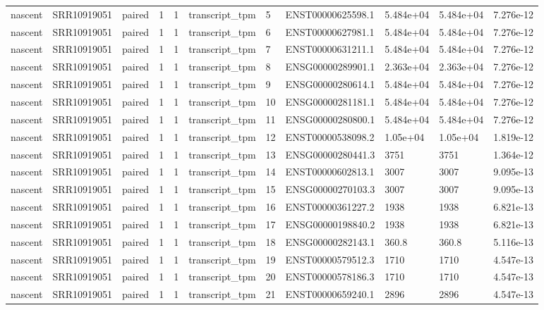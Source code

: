 \begin{tabular}{lllllllllll}
nascent & SRR10919051 & paired & 1 & 1 & transcript\_tpm & 5 & ENST00000625598.1 & 5.484e+04 & 5.484e+04 & 7.276e-12 \\
nascent & SRR10919051 & paired & 1 & 1 & transcript\_tpm & 6 & ENST00000627981.1 & 5.484e+04 & 5.484e+04 & 7.276e-12 \\
nascent & SRR10919051 & paired & 1 & 1 & transcript\_tpm & 7 & ENST00000631211.1 & 5.484e+04 & 5.484e+04 & 7.276e-12 \\
nascent & SRR10919051 & paired & 1 & 1 & transcript\_tpm & 8 & ENSG00000289901.1 & 2.363e+04 & 2.363e+04 & 7.276e-12 \\
nascent & SRR10919051 & paired & 1 & 1 & transcript\_tpm & 9 & ENSG00000280614.1 & 5.484e+04 & 5.484e+04 & 7.276e-12 \\
nascent & SRR10919051 & paired & 1 & 1 & transcript\_tpm & 10 & ENSG00000281181.1 & 5.484e+04 & 5.484e+04 & 7.276e-12 \\
nascent & SRR10919051 & paired & 1 & 1 & transcript\_tpm & 11 & ENSG00000280800.1 & 5.484e+04 & 5.484e+04 & 7.276e-12 \\
nascent & SRR10919051 & paired & 1 & 1 & transcript\_tpm & 12 & ENST00000538098.2 & 1.05e+04 & 1.05e+04 & 1.819e-12 \\
nascent & SRR10919051 & paired & 1 & 1 & transcript\_tpm & 13 & ENSG00000280441.3 & 3751 & 3751 & 1.364e-12 \\
nascent & SRR10919051 & paired & 1 & 1 & transcript\_tpm & 14 & ENST00000602813.1 & 3007 & 3007 & 9.095e-13 \\
nascent & SRR10919051 & paired & 1 & 1 & transcript\_tpm & 15 & ENSG00000270103.3 & 3007 & 3007 & 9.095e-13 \\
nascent & SRR10919051 & paired & 1 & 1 & transcript\_tpm & 16 & ENST00000361227.2 & 1938 & 1938 & 6.821e-13 \\
nascent & SRR10919051 & paired & 1 & 1 & transcript\_tpm & 17 & ENSG00000198840.2 & 1938 & 1938 & 6.821e-13 \\
nascent & SRR10919051 & paired & 1 & 1 & transcript\_tpm & 18 & ENSG00000282143.1 & 360.8 & 360.8 & 5.116e-13 \\
nascent & SRR10919051 & paired & 1 & 1 & transcript\_tpm & 19 & ENST00000579512.3 & 1710 & 1710 & 4.547e-13 \\
nascent & SRR10919051 & paired & 1 & 1 & transcript\_tpm & 20 & ENST00000578186.3 & 1710 & 1710 & 4.547e-13 \\
nascent & SRR10919051 & paired & 1 & 1 & transcript\_tpm & 21 & ENST00000659240.1 & 2896 & 2896 & 4.547e-13 \\

\end{tabular}
